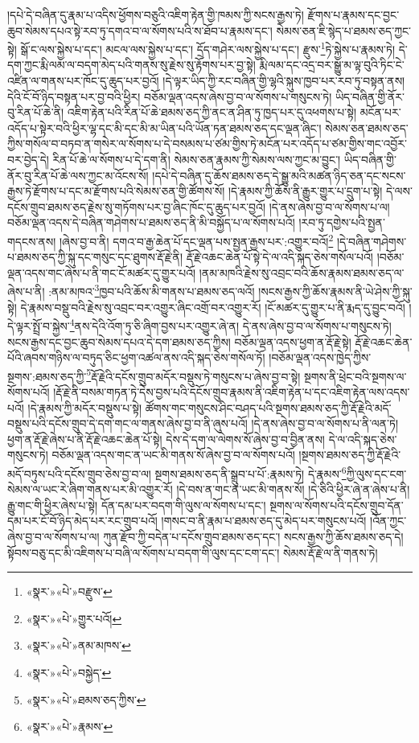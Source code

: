 །དཔེ་དེ་བཞིན་དུ་རྣམ་པ་འདིས་ཕྱོགས་བཅུའི་འཇིག་རྟེན་གྱི་ཁམས་ཀྱི་སངས་རྒྱས་ཏེ། རྫོགས་པ་རྣམས་དང་བྱང་ཆུབ་སེམས་དཔའ་སྟེ་རབ་ཏུ་དགའ་བ་ལ་སོགས་པའི་ས་ཐོབ་པ་རྣམས་དང་། སེམས་ཅན་ཇི་སྙེད་པ་ཐམས་ཅད་ཀྱང་སྟེ། སྒོ་ང་ལས་སྐྱེས་པ་དང་། མངལ་ལས་སྐྱེས་པ་དང་། དྲོད་གཤེར་ལས་སྐྱེས་པ་དང་། རྫུས་\footnote{«སྣར་»«པེ་»བརྫུས་}ཏེ་སྐྱེས་པ་རྣམས་ཏེ། དེ་དག་ཀྱང་རྨི་ལམ་ལ་བདག་མེད་པའི་གནས་སུ་རྗེས་སུ་རྟོགས་པར་བྱ་སྟེ། རྨི་ལམ་དང་འདྲ་བར་སྒྱུ་མ་ལྟ་བུའི་ཏིང་ངེ་འཛིན་ལ་གནས་པར་ཁོང་དུ་ཆུད་པར་བྱའོ། །དེ་ལྟར་ཡིད་ཀྱི་རང་བཞིན་གྱི་ལྷའི་སྐུས་ཁྱབ་པར་རབ་ཏུ་བསྟན་ནས། དེའི་ངོ་བོ་ཉིད་བསྟན་པར་བྱ་བའི་ཕྱིར། བཅོམ་ལྡན་འདས་ཞེས་བྱ་བ་ལ་སོགས་པ་གསུངས་ཏེ། ཡིད་བཞིན་གྱི་ནོར་བུ་རིན་པོ་ཆེ་ནི། འཇིག་རྟེན་པའི་རིན་པོ་ཆེ་ཐམས་ཅད་ཀྱི་ནང་ན་ཤིན་ཏུ་ཁྱད་པར་དུ་འཕགས་པ་སྟེ། མངོན་པར་འདོད་པ་སྟེར་བའི་ཕྱིར་ལྷ་དང་མི་དང་མི་མ་ཡིན་པའི་ཡོན་ཏན་ཐམས་ཅད་དང་ལྡན་ཞིང་། སེམས་ཅན་ཐམས་ཅད་ཀྱིས་གསོལ་བ་བཏབ་ན་གསེར་ལ་སོགས་པ་དེ་བསམས་པ་ཙམ་གྱིས་ཏེ་མངོན་པར་འདོད་པ་ཙམ་གྱིས་གང་འབྱོར་བར་བྱེད་དེ། རིན་པོ་ཆེ་ལ་སོགས་པ་དེ་དག་ནི། སེམས་ཅན་རྣམས་ཀྱི་སེམས་ལས་ཀྱང་མ་བྱུང་། ཡིད་བཞིན་གྱི་ནོར་བུ་རིན་པོ་ཆེ་ལས་ཀྱང་མ་འོངས་སོ། །དཔེ་དེ་བཞིན་དུ་ཆོས་ཐམས་ཅད་དེ་སྒྱུ་མའི་མཚན་ཉིད་ཅན་དང་སངས་རྒྱས་ཏེ་རྫོགས་པ་དང་མ་རྫོགས་པའི་སེམས་ཅན་གྱི་ཚོགས་སོ། །དེ་རྣམས་ཀྱི་ཆོས་ནི་རྒྱུར་གྱུར་པ་དྲུག་པ་སྟེ། དེ་ལས་དངོས་གྲུབ་ཐམས་ཅད་རྗེས་སུ་གཏོགས་པར་བྱ་ཞིང་ཁོང་དུ་ཆུད་པར་བྱའོ། །དེ་ནས་ཞེས་བྱ་བ་ལ་སོགས་པ་ལ། བཅོམ་ལྡན་འདས་དེ་བཞིན་གཤེགས་པ་ཐམས་ཅད་ནི་མི་བསྐྱོད་པ་ལ་སོགས་པའོ། །རབ་ཏུ་དགྱེས་པའི་སྤྱན་གདངས་ནས། །ཞེས་བྱ་བ་ནི། དགའ་བ་རྒྱ་ཆེན་པོ་དང་ལྡན་པས་སྤྱན་རྒྱས་པར་:འགྱུར་བའོ།\footnote{«སྣར་»«པེ་»གྱུར་པའོ།} །དེ་བཞིན་གཤེགས་པ་ཐམས་ཅད་ཀྱི་སྐུ་དང་གསུང་དང་ཐུགས་རྡོ་རྗེ་ནི། རྡོ་རྗེ་འཆང་ཆེན་པོ་སྟེ་དེ་ལ་འདི་སྐད་ཅེས་གསོལ་པའོ། །བཅོམ་ལྡན་འདས་གང་ཞེས་པ་ནི་གང་ངོ་མཚར་དུ་གྱུར་པའོ། །ནམ་མཁའི་རྗེས་སུ་འབྲང་བའི་ཆོས་རྣམས་ཐམས་ཅད་ལ་ཞེས་པ་ནི། :ནམ་མཁའ་\footnote{«སྣར་»«པེ་»ནམ་མཁས་}ཁྱབ་པའི་ཆོས་མི་གནས་པ་ཐམས་ཅད་ལའོ། །སངས་རྒྱས་ཀྱི་ཆོས་རྣམས་ནི་ཡེ་ཤེས་ཀྱི་སྐུ་སྟེ། དེ་རྣམས་བསྡུ་བའི་རྗེས་སུ་འབྲང་བར་འགྱུར་ཞིང་འགྲོ་བར་འགྱུར་རོ། །ངོ་མཚར་དུ་གྱུར་པ་ནི་རྨད་དུ་བྱུང་བའོ། །དེ་ལྟར་སྤྲོ་བ་སྐྱེས་\footnote{«སྣར་»«པེ་»བསྐྱེད་}ནས་དེའི་འོག་ཏུ་ཅི་ཞིག་བྱས་པར་འགྱུར་ཞེ་ན། དེ་ནས་ཞེས་བྱ་བ་ལ་སོགས་པ་གསུངས་ཏེ། སངས་རྒྱས་དང་བྱང་ཆུབ་སེམས་དཔའ་དེ་དག་ཐམས་ཅད་ཀྱིས། བཅོམ་ལྡན་འདས་ཕྱག་ན་རྡོ་རྗེ་སྟེ། རྡོ་རྗེ་འཆང་ཆེན་པོའི་ཞབས་གཉིས་ལ་བཏུད་ཅིང་ཕྱག་འཚལ་ནས་འདི་སྐད་ཅེས་གསོལ་ཏོ། །བཅོམ་ལྡན་འདས་ཁྱེད་ཀྱིས་སྔགས་:ཐམས་ཅད་ཀྱི་\footnote{«སྣར་»«པེ་»ཐམས་ཅད་ཀྱིས་}རྡོ་རྗེའི་དངོས་གྲུབ་མདོར་བསྡུས་ཏེ་གསུངས་པ་ཞེས་བྱ་བ་སྟེ། སྔགས་ནི་ཕྲེང་བའི་སྔགས་ལ་སོགས་པའོ། །རྡོ་རྗེ་ནི་བསམ་གཏན་ཏེ་དེས་བྱས་པའི་དངོས་གྲུབ་རྣམས་ནི་འཇིག་རྟེན་པ་དང་འཇིག་རྟེན་ལས་འདས་པའོ། །དེ་རྣམས་ཀྱི་མདོར་བསྡུས་པ་སྟེ། ཚོགས་གང་གསུངས་ཤིང་བཤད་པའི་སྔགས་ཐམས་ཅད་ཀྱི་རྡོ་རྗེའི་མདོ་བསྡུས་པའི་དངོས་གྲུབ་དེ་དག་གང་ལ་གནས་ཞེས་བྱ་བ་ནི་ཞུས་པའོ། །དེ་ནས་ཞེས་བྱ་བ་ལ་སོགས་པ་ནི་ལན་ཏེ། ཕྱག་ན་རྡོ་རྗེ་ཞེས་པ་ནི་རྡོ་རྗེ་འཆང་ཆེན་པོ་སྟེ། དེས་དེ་དག་ལ་ལེགས་སོ་ཞེས་བྱ་བ་བྱིན་ནས། དེ་ལ་འདི་སྐད་ཅེས་གསུངས་ཏེ། བཅོམ་ལྡན་འདས་གང་ན་ཡང་མི་གནས་སོ་ཞེས་བྱ་བ་ལ་སོགས་པའོ། །སྔགས་ཐམས་ཅད་ཀྱི་རྡོ་རྗེའི་མདོ་བཏུས་པའི་དངོས་གྲུབ་ཅེས་བྱ་བ་ལ། སྔགས་ཐམས་ཅད་ནི་སྒྲུབ་པ་པོ་:རྣམས་ཏེ། དེ་རྣམས་\footnote{«སྣར་»«པེ་»རྣམས་}ཀྱི་ལུས་དང་ངག་སེམས་ལ་ཡང་རེ་ཞིག་གནས་པར་མི་འགྱུར་རོ། །དེ་བས་ན་གང་ན་ཡང་མི་གནས་སོ། །དེ་ཅིའི་ཕྱིར་ཞེ་ན་ཞེས་པ་ནི། རྒྱུ་གང་གི་ཕྱིར་ཞེས་པ་སྟེ། དོན་དམ་པར་བདག་གི་ལུས་ལ་སོགས་པ་དང་། སྔགས་ལ་སོགས་པའི་དངོས་གྲུབ་དོན་དམ་པར་ངོ་བོ་ཉིད་མེད་པར་རང་གྲུབ་པའོ། །གསང་བ་ནི་རྣམ་པ་ཐམས་ཅད་དུ་མེད་པར་གསུངས་པའོ། །འོན་ཀྱང་ཞེས་བྱ་བ་ལ་སོགས་པ་ལ། ཀུན་རྫོབ་ཀྱི་བདེན་པ་དངོས་གྲུབ་ཐམས་ཅད་དང་། སངས་རྒྱས་ཀྱི་ཆོས་ཐམས་ཅད་དེ། སྟོབས་བཅུ་དང་མི་འཇིགས་པ་བཞི་ལ་སོགས་པ་བདག་གི་ལུས་དང་ངག་དང་། སེམས་རྡོ་རྗེ་ལ་ནི་གནས་ཏེ། 